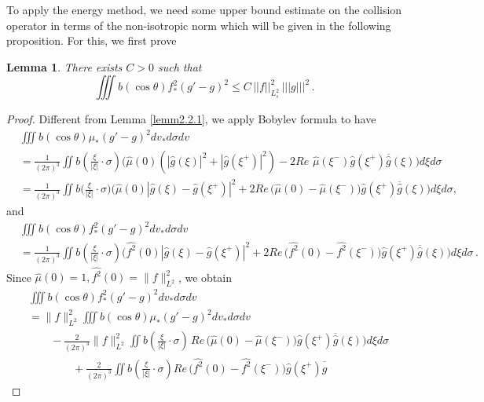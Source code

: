 \documentclass{amsart}[12pt, article]
\newtheorem{lemm}[theo]{Lemma}
\begin{document}
 To apply the energy method, we  need  some upper bound
 estimate on the collision operator
 in terms of the non-isotropic norm which will be given in the
 following proposition. For  this, we first prove

\begin{lemm}\label{lemm2.3.1}
 There exists
$C>0$ such that
\begin{equation}\label{2.3.1}
\iiint b(\cos\theta) f^2_\ast (g'-g)^2 \leq C\, || f||^2_{L^2_s}
\,||| g|||^2\,.
\end{equation}
\end{lemm}
\begin{proof}
Different {}from Lemma
\ref{lemm2.2.1},  we apply Bobylev formula \cite{bobylev} to have
\begin{align*}
&\iiint b(\cos\theta) \mu_\ast (g'-g)^2dv_*d\sigma dv \\
&=\frac{1}{(2\pi)^3}\iint b \left(\frac{\xi}{|\xi|}\cdot \sigma
\right) \Big(\hat \mu (0) (|\hat g (\xi )|^2 + |\hat g (\xi^+ )|^2 )- 2
Re\,\, \hat \mu (\xi^-)  \hat g (\xi^+ ) \overline{\hat g} (\xi )
\Big )d\xi d\sigma \\
&=\frac{1}{(2\pi)^3}\iint b \Big(\frac{\xi}{|\xi|}\cdot \sigma \Big)
\Big(\hat \mu (0) | \hat g (\xi ) - \hat g (\xi^+) |^2 + 2 Re\,
\Big(\hat \mu (0) - \hat \mu (\xi^-) \Big) \hat g (\xi^+ )
\overline{\hat g} (\xi ) \Big)d\xi d\sigma ,
\end{align*}
and
\begin{align*}
&\iiint b(\cos\theta) f^2_\ast (g'-g)^2dv_*d\sigma dv\\
&=\frac{1}{(2\pi)^3}\iint b \left(\frac{\xi}{|\xi|}\cdot \sigma
\right) \Big(\widehat{f^2} (0) | \hat g (\xi ) - \hat g (\xi^+) |^2+
2 Re\, \Big(\widehat{f^2} (0) - \widehat{f^2} (\xi^-) \Big) \hat g
(\xi^+ ) \overline{\hat g} (\xi ) \Big)d\xi d\sigma\, .
\end{align*}
Since $\hat \mu (0)=1, \widehat{f^2} (0)=\|f\|^2_{L^2}$, we obtain
\begin{align*}
&\iiint b(\cos\theta) f^2_\ast (g'-g)^2dv_*d\sigma dv\\
&=\|f\|^2_{L^2}\iiint b(\cos\theta) \mu_\ast (g'-g)^2dv_*d\sigma dv\\
&\qquad-\frac{2}{(2\pi)^3}\|f\|^2_{L^2}\iint b
\left(\frac{\xi}{|\xi|}\cdot \sigma \right)\,Re\, \Big(\hat \mu (0)
- \hat \mu (\xi^-) \Big) \hat g (\xi^+ ) \overline{\hat g} (\xi )
\Big)d\xi d\sigma\\
&\qquad\qquad+ \frac{2}{(2\pi)^3}\iint b
\left(\frac{\xi}{|\xi|}\cdot \sigma \right) Re\, \Big(\widehat{f^2}
(0) - \widehat{f^2} (\xi^-) \Big) \hat g (\xi^+ ) \overline{\hat g}

\end{align*}
\end{proof}
\end{document}
